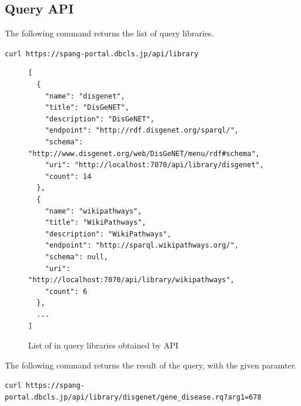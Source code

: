 \documentclass[runningheads]{llncs}
\begin{document}
\subsection{Query API}

The following command returns the list of query libraries.

\texttt{curl https://spang-portal.dbcls.jp/api/library}

\begin{figure}[!t]
\begin{scriptsize}
\begin{verbatim}
[
  {
    "name": "disgenet",
    "title": "DisGeNET",
    "description": "DisGeNET",
    "endpoint": "http://rdf.disgenet.org/sparql/",
    "schema": "http://www.disgenet.org/web/DisGeNET/menu/rdf#schema",
    "uri": "http://localhost:7070/api/library/disgenet",
    "count": 14
  },
  {
    "name": "wikipathways",
    "title": "WikiPathways",
    "description": "WikiPathways",
    "endpoint": "http://sparql.wikipathways.org/",
    "schema": null,
    "uri": "http://localhost:7070/api/library/wikipathways",
    "count": 6
  },
  ...
]
\end{verbatim}
\end{scriptsize}
\caption{List of in query libraries obtained by API}
\label{fig:example-rdf}
\end{figure}

The following command returns the result of the query, with the given paramter.

\texttt{curl https://spang-portal.dbcls.jp/api/library/disgenet/gene\_disease.rq?arg1=678}
\end{document}
